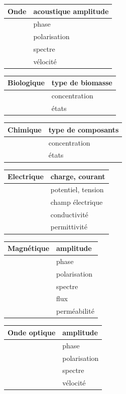 \begin {center}
\begin{tabular}{|p{3cm}|p{7cm}|}
\hline
Onde & acoustique	amplitude \\
\hline
 & 	phase \\
\hline
 & 	polarisation \\
\hline
 & 	spectre \\
\hline
 & 	vélocité \\
\hline
\end{tabular}
\begin{tabular}{|p{3cm}|p{7cm}|}
Biologique &	type de biomasse \\
\hline
 & 	concentration \\
\hline
 & 	états \\
\hline
\end{tabular}
\begin{tabular}{|p{3cm}|p{7cm}|}
Chimique &	type de composants \\
\hline
 & 	concentration \\
\hline
 & 	états \\
\hline
\end{tabular}
\begin{tabular}{|p{3cm}|p{7cm}|}
Electrique &	charge, courant \\
\hline
 & 	potentiel, tension \\
\hline
 & 	champ électrique \\
\hline
 & 	conductivité \\
\hline
 & 	permittivité \\
\hline
\end{tabular}
\begin{tabular}{|p{3cm}|p{7cm}|}
Magnétique &	amplitude \\
\hline
  &	phase \\
\hline
  &	polarisation \\
\hline
  &	spectre \\
\hline
  &	flux \\
\hline
  &	perméabilité \\
\hline
\end{tabular}
\begin{tabular}{|p{3cm}|p{7cm}|}
Onde optique &	amplitude \\
\hline
 & 	phase \\
\hline
 & 	polarisation \\
\hline
 & 	spectre \\
\hline
 & 	vélocité \\

\end{tabular}
\end{center}
